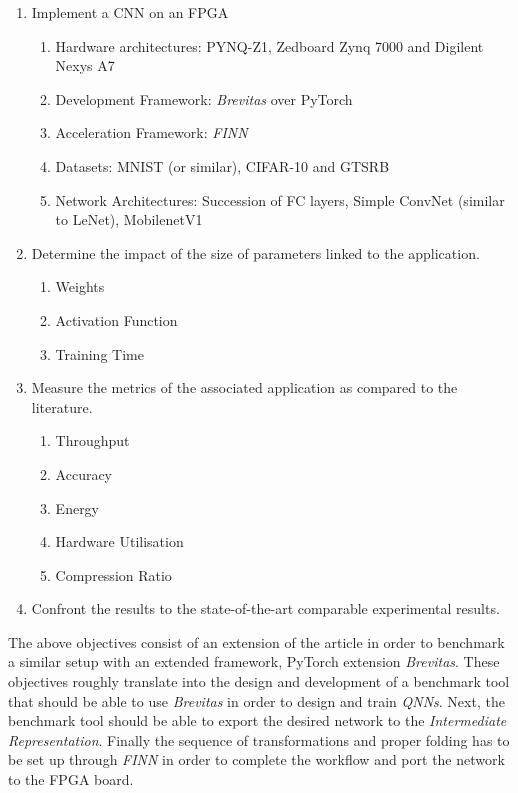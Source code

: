 \begin{enumerate}
  \item Implement a CNN on an FPGA
  \begin{enumerate}
    \item Hardware architectures: PYNQ-Z1, Zedboard Zynq 7000 and Digilent Nexys A7
    \item Development Framework: \emph{Brevitas} over PyTorch
    \item Acceleration Framework: \emph{FINN}
    \item Datasets: MNIST (or similar), CIFAR-10 and GTSRB
    \item Network Architectures: Succession of FC layers, Simple ConvNet (similar to LeNet), MobilenetV1
  \end{enumerate}
  \item Determine the impact of the size of parameters linked to the application.
  \begin{enumerate}
    \item Weights
    \item Activation Function
    \item Training Time
  \end{enumerate}
  \item Measure the metrics of the associated application as compared to the literature.
  \begin{enumerate}
    \item Throughput
    \item Accuracy
    \item Energy
    \item Hardware Utilisation
    \item Compression Ratio
  \end{enumerate}
  \item Confront the results to the state-of-the-art comparable experimental results.
\end{enumerate}

The above objectives consist of an extension of the \cite{Bacchus2020} article in order to benchmark a similar setup with an extended framework, PyTorch extension \emph{Brevitas}. These objectives roughly translate into the design and development of a benchmark tool that should be able to use \emph{Brevitas} in order to design and train \emph{QNNs}. Next, the benchmark tool should be able to export the desired network to the \emph{Intermediate Representation}. Finally the sequence of transformations and proper folding has to be set up through \emph{FINN} in order to complete the workflow and port the network to the FPGA board.

